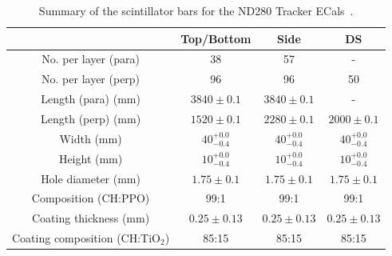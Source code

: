 \begin{table}[t!]
  \begin{tabular}{ c c c c }
     & Top/Bottom & Side & DS \\ \hline \hline
  No. per layer (para) & 38 & 57 & - \\
  No. per layer (perp) & 96 & 96 & 50 \\
  Length (para) (mm) & $3840\pm0.1$ & $3840\pm0.1$ & - \\
  Length (perp) (mm) & $1520\pm0.1$ & $2280\pm0.1$ & $2000\pm0.1$ \\
  Width (mm) & $40^{+0.0}_{-0.4}$ & $40^{+0.0}_{-0.4}$& $40^{+0.0}_{-0.4}$ \\
  Height (mm) & $10^{+0.0}_{-0.4}$ & $10^{+0.0}_{-0.4}$& $10^{+0.0}_{-0.4}$ \\
  Hole diameter (mm) & $1.75\pm0.1$ & $1.75\pm0.1$ & $1.75\pm0.1$ \\
  Composition (CH:PPO) & 99:1 & 99:1 & 99:1 \\
  Coating thickness (mm) & $0.25\pm0.13$ & $0.25\pm0.13$ & $0.25\pm0.13$ \\
  Coating composition (CH:TiO$_2$) & 85:15 & 85:15 & 85:15 \\
  \end{tabular}
  \caption{Summary of the scintillator bars for the ND280 Tracker ECals~\cite{1748-0221-8-10-P10019}.}
  \label{table:ScintillatorBarDimensions}
\end{table}


